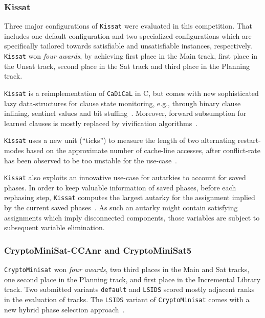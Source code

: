 \documentclass{elsarticle}
\newcommand{\solver}[1]{\texttt{#1}}
\begin{document}
\subsubsection{Kissat} 

Three major configurations of \solver{Kissat} were evaluated in this competition. 
That includes one default configuration and two specialized configurations which are specifically tailored towards satisfiable and unsatisfiable instances, respectively. 
\solver{Kissat} won \emph{four awards}, by achieving first place in the Main track, first place in the Unsat track, second place in the Sat track and third place in the Planning track. 

\solver{Kissat} is a reimplementation of \solver{CaDiCaL} in C,
but comes with new sophisticated lazy data-structures for clause state monitoring, e.g., through binary clause inlining, sentinel values and bit stuffing~\cite{Biere:SC2019,Biere:SC2020}. 
Moreover, forward subsumption for learned clauses is mostly replaced by vivification algorithms~\cite{ChuMinLi:2020:Vivification}. 

\solver{Kissat} uses a new unit (``ticks'') to measure the length of two alternating restart-modes based on the approximate number of cache-line accesses, after conflict-rate has been observed to be too unstable for the use-case~\cite{Biere:SC2020}. 

\solver{Kissat} also exploits an innovative use-case for autarkies to account for saved phases. 
In order to keep valuable information of saved phases, before each rephasing step, \solver{Kissat} computes the largest autarky for the assignment implied by the current saved phases~\cite{Kiesl:2019:Autarkies}. 
As such an autarky might contain satisfying assignments which imply disconnected components, those variables are subject to subsequent variable elimination. 


\subsubsection{CryptoMiniSat-CCAnr and CryptoMiniSat5}
\label{sec:cryptominisat}

\solver{CryptoMinisat} won \emph{four awards}, two third places in the Main and Sat tracks, one second place in the Planning track, and first place in the Incremental Library track. 
Two submitted variants \solver{default} and \solver{LSIDS} scored mostly adjacent ranks in the evaluation of tracks. 
The \solver{LSIDS} variant of \solver{CryptoMinisat} comes with a new hybrid phase selection approach~\cite{Shaw:2020:LSIDS,Soos:SC2020}.
\end{document}
